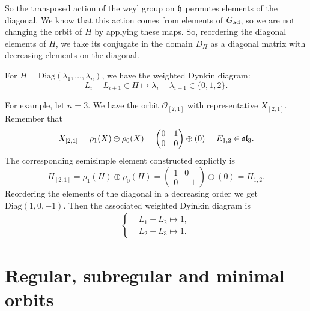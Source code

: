 So the transposed action of the weyl group on $\mathfrak{h}$ permutes elements of the diagonal. We know that this action comes 
from elements of $G_{\text{ad}}$, so we are not changing the orbit of $H$ by applying these maps. So, reordering the diagonal elements 
of $H$, we take its conjugate in the domain $D_\Pi$ as a diagonal matrix with decreasing elements on the diagonal.

For $H=\text{Diag}(\lambda_1,\dots,\lambda_n)$, we have the weighted Dynkin diagram:
\begin{equation}
    L_i-L_{i+1} \in\Pi\mapsto \lambda_i-\lambda_{i+1}\in\{0,1,2\}.
\end{equation}

For example, let $n=3$. We have the orbit $\mathcal{O}_{[2,1]}$ with representative $X_{[2,1]}$. Remember that 
\begin{equation}
    X_{[2,1]}=\rho_1(X)\oplus\rho_0(X)=\begin{pmatrix}0&1\\0&0\end{pmatrix}\oplus(0)=E_{1,2}\in\mathfrak{sl}_3.
\end{equation}
The corresponding semisimple element constructed explictly is 
\begin{equation}
    H_{[2,1]}=\rho_1(H)\oplus\rho_0(H)=\begin{pmatrix}1&0\\0&-1\end{pmatrix}\oplus(0)=H_{1,2}.
\end{equation}
Reordering the elements of the diagonal in a decreasing order we get 
$\text{Diag}(1,0,-1)$. Then the associated weighted Dyinkin diagram is
\begin{align*}
    \left\{\begin{aligned}
        &L_1-L_2\mapsto 1,\\
        &L_2-L_3\mapsto 1.
    \end{aligned}\right.
\end{align*}


\section{Regular, subregular and minimal orbits}


